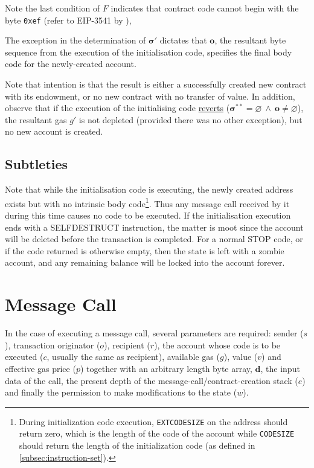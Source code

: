 \documentclass[9pt,oneside]{amsart}
\begin{document}
\begin{multicols}{2}
Note the last condition of $F$ indicates that contract code cannot begin with the byte \texttt{0xef} (refer to EIP-3541 by \cite{EIP-3541}),

The exception in the determination of $\boldsymbol{\sigma}'$ dictates that $\mathbf{o}$, the resultant byte sequence from the execution of the initialisation code, specifies the final body code for the newly-created account.

Note that intention is that the result is either a successfully created new contract with its endowment, or no new contract with no transfer of value.
In addition, observe that if the execution of the initialising code \hyperlink{REVERT}{reverts} ($\boldsymbol{\sigma}^{**} = \varnothing \ \wedge\ \mathbf{o} \neq \varnothing$), the resultant gas $g'$ is not depleted (provided there was no other exception), but no new account is created.

\subsection{Subtleties}
Note that while the initialisation code is executing, the newly created address exists but with no intrinsic body code\footnote{During initialization code execution, \texttt{EXTCODESIZE} on the address should return zero, which is the length of the code of the account while \texttt{CODESIZE} should return the length of the initialization code (as defined in \ref{subsec:instruction-set}).}. Thus any message call received by it during this time causes no code to be executed. If the initialisation execution ends with a {\small SELFDESTRUCT} instruction, the matter is moot since the account will be deleted before the transaction is completed. For a normal {\small STOP} code, or if the code returned is otherwise empty, then the state is left with a zombie account, and any remaining balance will be locked into the account forever.

\section{Message Call} \label{ch:call}
In the case of executing a message call, several parameters are required: sender ($s$), transaction originator ($o$), recipient ($r$), the account whose code is to be executed ($c$, usually the same as recipient), available gas ($g$), value ($v$) and effective gas price ($p$) together with an arbitrary length byte array, $\mathbf{d}$, the input data of the call, the present depth of the message-call/contract-creation stack ($e$) and finally the permission to make modifications to the state ($w$).


\end{multicols}
\end{document}
